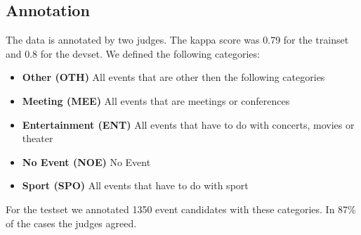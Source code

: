 \documentclass[
10pt, %
a4paper, %
oneside, %
headinclude,footinclude, %
BCOR5mm, %
]{scrartcl}
\begin{document}
\subsection{Annotation}
The data is annotated by two judges. The kappa score was 0.79 for the trainset and 0.8 for the devset. We defined the following categories:

\begin{itemize}[noitemsep] %
\item \textbf{Other (OTH)} All events that are other then the following categories 
\item \textbf{Meeting (MEE)} All events that are meetings or conferences 
\item \textbf{Entertainment (ENT)} All events that have to do with concerts, movies or theater
\item \textbf{No Event (NOE)} No Event
\item \textbf{Sport (SPO)} All events that have to do with sport 
\end{itemize}
For the testset we annotated 1350 event candidates with these categories. In 87\% of the cases the judges agreed.
\end{document}
